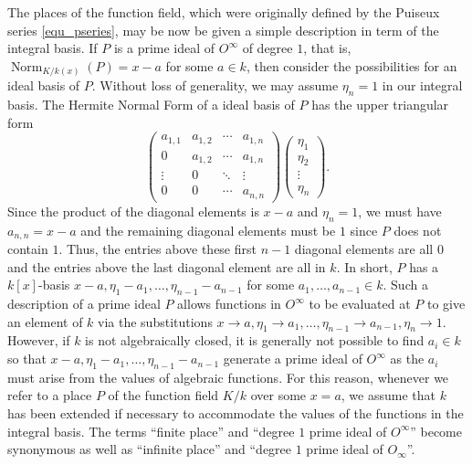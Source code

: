 \documentclass[12pt,reqno]{amsart}
\numberwithin{equation}{section}
\begin{document}
The places of the function field, which were originally defined by the Puiseux series \eqref{equ_pseries}, may be now be given a simple description in term of the integral basis. If $P$ is a prime ideal of $O^{\infty}$ of degree $1$, that is, $\operatorname{Norm}_{K/k(x)}(P)=x-a$ for some $a \in k$, then consider the possibilities for an ideal basis of $P$. Without loss of generality, we may assume $\eta_n=1$ in our integral basis. The Hermite Normal Form of a ideal basis of $P$ has the upper triangular form
\begin{equation*}
\left(
 \begin{array}{cccc}
  a_{1,1} & a_{1,2} & \cdots & a_{1,n}\\
  0 & a_{1,2} & \cdots & a_{1,n}\\
  \vdots & 0 & \ddots & \vdots\\
  0 & 0 & \cdots & a_{n,n}
 \end{array}
\right) \left(
\begin{array}{c}
  \eta_1\\
  \eta_2\\
  \vdots\\
  \eta_n
 \end{array}
\right)\text{.}
\end{equation*}
Since the product of the diagonal elements is $x-a$ and $\eta_n=1$, we must have $a_{n,n}=x-a$ and the remaining diagonal elements must be $1$ since $P$ does not contain $1$. Thus, the entries above these first $n-1$ diagonal elements are all $0$ and the entries above the last diagonal element are all in $k$. In short, $P$ has a $k[x]$-basis $x-a,\eta_1-a_1,\dots,\eta_{n-1}-a_{n-1}$ for some $a_1,\dots,a_{n-1} \in k$. Such a description of a prime ideal $P$ allows functions in $O^{\infty}$ to be evaluated at $P$ to give an element of $k$ via the substitutions $x \to a,\eta_1 \to a_1,\dots,\eta_{n-1} \to a_{n-1},\eta_n \to 1$. However, if $k$ is not algebraically closed, it is generally not possible to find $a_i \in k$ so that $x-a,\eta_1-a_1,\dots,\eta_{n-1}-a_{n-1}$ generate a prime ideal of $O^{\infty}$ as the $a_i$ must arise from the values of algebraic functions. For this reason, whenever we refer to a place $P$ of the function field $K/k$ over some $x=a$, we assume that $k$ has been extended if necessary to accommodate the values of the functions in the integral basis. The terms ``finite place'' and ``degree $1$ prime ideal of $O^{\infty}$'' become synonymous as well as ``infinite place'' and ``degree $1$ prime ideal of $O_{\infty}$''.
\end{document}
